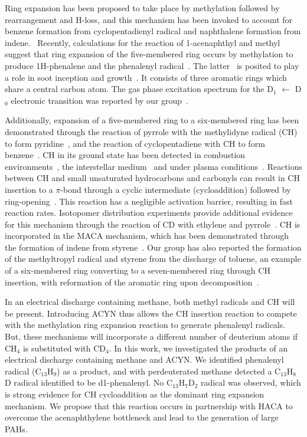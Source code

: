 \documentclass[journal=jacsat,manuscript=article,layout=onecolumn]{achemso}
\begin{document}
Ring expansion has been proposed to take place by methylation followed by rearrangement and H-loss, and this mechanism has been invoked to account for benzene formation from cyclopentadienyl radical and naphthalene formation from indene.~\cite{mel96,mos96,sha09,meb16,jas13,zha19,meb17} Recently, calculations for the reaction of 1-acenaphthyl and methyl suggest that ring expansion of the five-membered ring occurs by methylation to produce 1H-phenalene and the phenalenyl radical~\cite{por20}. The latter~\cite{mor11,oco17} is posited to play a role in soot inception and growth~\cite{joh18}. It consists of three aromatic rings which share a central carbon atom. The gas phase excitation spectrum for the D$_1$ $\leftarrow$ D$_0$ electronic transition was reported by our group~\cite{oco11}.

Additionally, expansion of a five-membered ring to a six-membered ring has been demonstrated through the reaction of pyrrole with the methylidyne radical (CH) to form pyridine~\cite{soo10}, and the reaction of cyclopentadiene with CH to form benzene~\cite{cas19}. CH in its ground state has been detected in combustion environments~\cite{lov11,tin11,zha12}, the interstellar medium~\cite{ger10,ada41} and under plasma conditions~\cite{zho06}. Reactions between CH and small unsaturated hydrocarbons and carbonyls can result in CH insertion to a $\pi$-bond through a cyclic intermediate (cycloaddition) followed by ring-opening~\cite{gou09,tre13,gou12,tre16,cas19}. This reaction has a negligible activation barrier, resulting in fast reaction rates. Isotopomer distribution experiments provide additional evidence for this mechanism through the reaction of CD with ethylene and pyrrole~\cite{gou09,soo10}. CH is incorporated in the MACA mechanism, which has been demonstrated through the formation of indene from styrene~\cite{dod21}. Our group has also reported the formation of the methyltropyl radical and styrene from the discharge of toluene, an example of a six-membered ring converting to a seven-membered ring through CH insertion, with reformation of the aromatic ring upon decomposition~\cite{rei18}. %

In an electrical discharge containing methane, both methyl radicals and CH will be present. Introducing ACYN thus allows the CH insertion reaction to compete with the methylation ring expansion reaction to generate phenalenyl radicals. But, these mechanisms will incorporate a different number of deuterium atoms if CH$_4$ is substituted with CD$_4$. In this work, we investigated the products of an electrical discharge containing methane and ACYN. We identified phenalenyl radical (C$_{13}$H$_9$) as a product, and with perdeuterated methane detected a C$_{13}$H$_8$D radical identified to be d1-phenalenyl. No C$_{13}$H$_7$D$_2$ radical was observed, which is strong evidence for CH cycloaddition as the dominant ring expansion mechanism. We propose that this reaction occurs in partnership with HACA to overcome the acenaphthylene bottleneck and lead to the generation of large PAHs.
\end{document}
